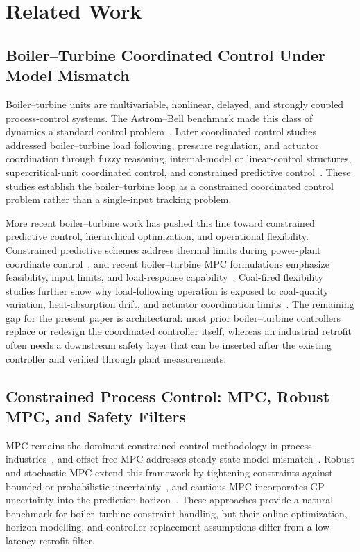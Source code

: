 \section{Related Work}
\label{sec:related}

\subsection{Boiler--Turbine Coordinated Control Under Model Mismatch}

Boiler--turbine units are multivariable, nonlinear, delayed, and strongly coupled process-control systems. The Astrom--Bell benchmark made this class of dynamics a standard control problem~\cite{astrom2000boiler}. Later coordinated control studies addressed boiler--turbine load following, pressure regulation, and actuator coordination through fuzzy reasoning, internal-model or linear-control structures, supercritical-unit coordinated control, and constrained predictive control~\cite{li2005coordinated,tan2006supercritical,liu2010nonlinear}. These studies establish the boiler--turbine loop as a constrained coordinated control problem rather than a single-input tracking problem.

More recent boiler--turbine work has pushed this line toward constrained predictive control, hierarchical optimization, and operational flexibility. Constrained predictive schemes address thermal limits during power-plant coordinate control~\cite{liu2010nonlinear}, and recent boiler--turbine MPC formulations emphasize feasibility, input limits, and load-response capability~\cite{abdelbaky2025ioflmpc}. Coal-fired flexibility studies further show why load-following operation is exposed to coal-quality variation, heat-absorption drift, and actuator coordination limits~\cite{liu2016coal}. The remaining gap for the present paper is architectural: most prior boiler--turbine controllers replace or redesign the coordinated controller itself, whereas an industrial retrofit often needs a downstream safety layer that can be inserted after the existing controller and verified through plant measurements.

\subsection{Constrained Process Control: MPC, Robust MPC, and Safety Filters}

MPC remains the dominant constrained-control methodology in process industries~\cite{qin2003survey,mayne2000constrained}, and offset-free MPC addresses steady-state model mismatch~\cite{morari1999model}. Robust and stochastic MPC extend this framework by tightening constraints against bounded or probabilistic uncertainty~\cite{mayne2005robust,mesbah2016stochastic}, and cautious MPC incorporates GP uncertainty into the prediction horizon~\cite{hewing2020cautious}. These approaches provide a natural benchmark for boiler--turbine constraint handling, but their online optimization, horizon modelling, and controller-replacement assumptions differ from a low-latency retrofit filter.

